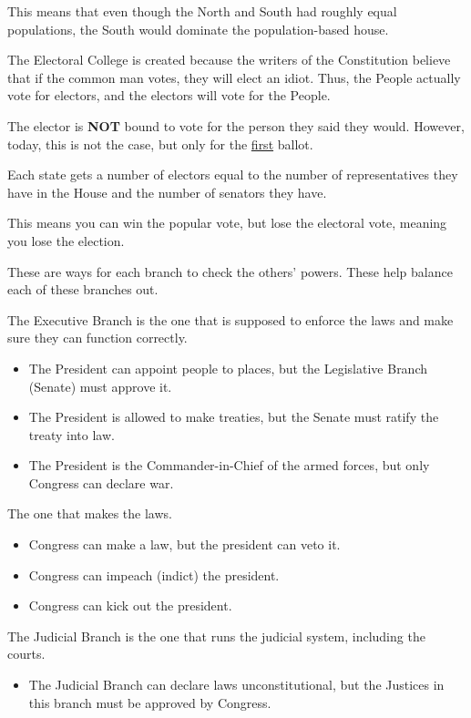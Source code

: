 \begin{description}
  This means that even though the North and South had roughly equal populations, the South would dominate the population-based house.
\item[Electoral College] The Electoral College is created because the writers of the Constitution believe that if the common man votes, they will elect an idiot.
  Thus, the People actually vote for electors, and the electors will vote for the People.

  The elector is \textbf{NOT} bound to vote for the person they said they would.
  However, today, this is not the case, but only for the \underline{first} ballot.

  Each state gets a number of electors equal to the number of representatives they have in the House and the number of senators they have.

  This means you can win the popular vote, but lose the electoral vote, meaning you lose the election.

\item[Checks and Balances] These are ways for each branch to check the others' powers.
  These help balance each of these branches out.

  \begin{description}[noitemsep]
  \item[Executive Branch] The Executive Branch is the one that is supposed to enforce the laws and make sure they can function correctly.
    \begin{itemize}[noitemsep]
    \item The President can appoint people to places, but the Legislative Branch (Senate) must approve it.
    \item The President is allowed to make treaties, but the Senate must ratify the treaty into law.
    \item The President is the Commander-in-Chief of the armed forces, but only Congress can declare war.
    \end{itemize}
  \item[Legislative Branch] The one that makes the laws.
    \begin{itemize}[noitemsep]
    \item Congress can make a law, but the president can veto it.
    \item Congress can impeach (indict) the president.
    \item Congress can kick out the president.
    \end{itemize}
  \item[Judicial Branch] The Judicial Branch is the one that runs the judicial system, including the courts.
    \begin{itemize}[noitemsep]
    \item The Judicial Branch can declare laws unconstitutional, but the Justices in this branch must be approved by Congress.
    \end{itemize}
  \end{description}


\end{description}
